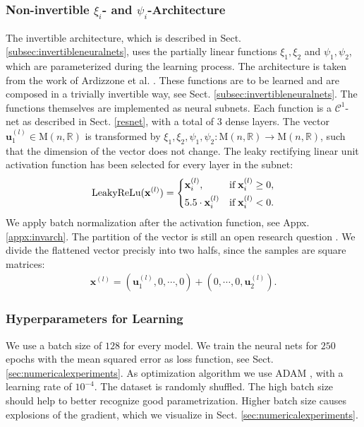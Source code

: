 \documentclass[envcountsect,runningheads]{llncs}
\begin{document}
\subsubsection{Non-invertible $\xi_i$- and $\psi_i$-Architecture}
The invertible architecture, which is described in Sect. \ref{subsec:invertibleneuralnets}, uses the partially linear functions $\xi_1,\xi_2$ and $\psi_1,\psi_2$, which are parameterized during the learning process. The architecture is taken from the work of Ardizzone et al. \cite{ArdizzoneKRK19}. These functions are to be learned and are composed in a trivially invertible way, see Sect. \ref{subsec:invertibleneuralnets}. The functions themselves are implemented as neural subnets. Each function is a $\mathcal{C}^1$-net as described in Sect. \ref{resnet}, with a total of $3$ dense layers. The vector $\mathbf{u}_{1}^{(l)} \in \text{M}(n,\mathbb{R})$ is transformed by $\xi_1,\xi_2,\psi_1,\psi_2: \text{M}(n,\mathbb{R}) \rightarrow \text{M}(n,\mathbb{R})$, such that the dimension of the vector does not change. The leaky rectifying linear unit activation function has been selected for every layer in the subnet:
\begin{align}
	\text{LeakyReLu}(\mathbf{x}^{(l)}) = 
	\begin{dcases}
	    \mathbf{x}^{(l)}_{i},
	    & \text{if} \; \mathbf{x}^{(l)}_{i} \geq 0, \\
	    5.5 \cdot \mathbf{x}^{(l)}_{i}
	    & \text{if} \; \mathbf{x}^{(l)}_{i} < 0.
	\end{dcases}
\end{align}
We apply batch normalization after the activation function, see Appx. \ref{appx:invarch}. The partition of the vector is still an open research question \cite{ArdizzoneKRK19}. We divide the flattened vector precisly into two halfs, since the samples are square matrices:
\begin{align}
\mathbf{x}^{(l)} = (\mathbf{u}^{(l)}_1, 0, \cdots, 0) + (0, \cdots, 0, \mathbf{u}^{(l)}_2).
\end{align}

\subsubsection{Hyperparameters for Learning} We use a batch size of $128$ for every model. We train the neural nets for $250$ epochs with the mean squared error as loss function, see Sect. \ref{sec:numericalexperiments}. As optimization algorithm we use ADAM \cite{KingmaB14}, with a learning rate of $10^{-4}$. The dataset is randomly shuffled. The high batch size should help to better recognize good parametrization. Higher batch size causes explosions of the gradient, which we visualize in Sect. \ref{sec:numericalexperiments}.


\renewcommand{\refname}{References for Appendices}

\end{document}

